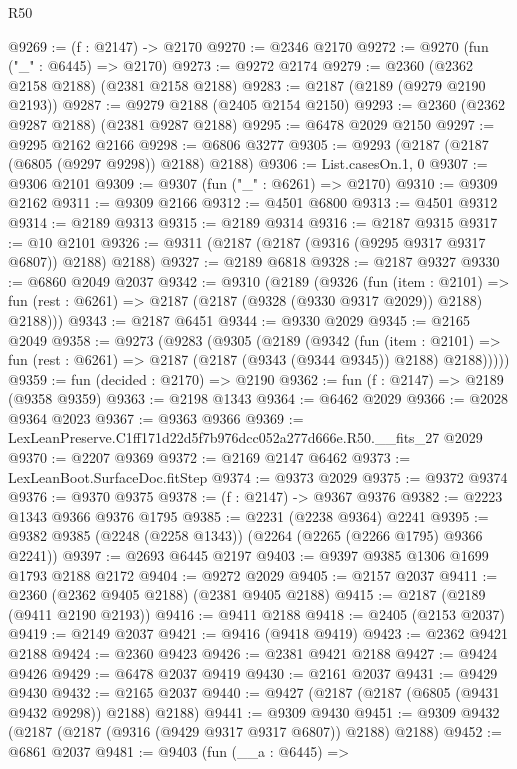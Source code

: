 \begin{lexlean}{R50}
\begin{coremodule}
@9269 := (f : @2147) -> @2170
@9270 := @2346 @2170
@9272 := @9270 (fun ("_" : @6445) => @2170)
@9273 := @9272 @2174
@9279 := @2360 (@2362 @2158 @2188) (@2381 @2158 @2188)
@9283 := @2187 (@2189 (@9279 @2190 @2193))
@9287 := @9279 @2188 (@2405 @2154 @2150)
@9293 := @2360 (@2362 @9287 @2188) (@2381 @9287 @2188)
@9295 := @6478 @2029 @2150
@9297 := @9295 @2162 @2166
@9298 := @6806 @3277
@9305 := @9293 (@2187 (@2187 (@6805 (@9297 @9298)) @2188) @2188)
@9306 := List.casesOn.{1, 0}
@9307 := @9306 @2101
@9309 := @9307 (fun ("_" : @6261) => @2170)
@9310 := @9309 @2162
@9311 := @9309 @2166
@9312 := @4501 @6800
@9313 := @4501 @9312
@9314 := @2189 @9313
@9315 := @2189 @9314
@9316 := @2187 @9315
@9317 := @10 @2101
@9326 := @9311 (@2187 (@2187 (@9316 (@9295 @9317 @9317 @6807)) @2188) @2188)
@9327 := @2189 @6818
@9328 := @2187 @9327
@9330 := @6860 @2049 @2037
@9342 := @9310
    (@2189
      (@9326
        (fun (item : @2101) =>
        fun (rest : @6261) => @2187 (@2187 (@9328 (@9330 @9317 @2029)) @2188) @2188)))
@9343 := @2187 @6451
@9344 := @9330 @2029
@9345 := @2165 @2049
@9358 := @9273
    (@9283
      (@9305
        (@2189
          (@9342
            (fun (item : @2101) =>
            fun (rest : @6261) => @2187 (@2187 (@9343 (@9344 @9345)) @2188) @2188)))))
@9359 := fun (decided : @2170) => @2190
@9362 := fun (f : @2147) => @2189 (@9358 @9359)
@9363 := @2198 @1343
@9364 := @6462 @2029
@9366 := @2028 @9364 @2023
@9367 := @9363 @9366
@9369 := LexLeanPreserve.C1ff171d22d5f7b976dcc052a277d666e.R50.__fits_27 @2029
@9370 := @2207 @9369
@9372 := @2169 @2147 @6462
@9373 := LexLeanBoot.SurfaceDoc.fitStep
@9374 := @9373 @2029
@9375 := @9372 @9374
@9376 := @9370 @9375
@9378 := (f : @2147) -> @9367 @9376
@9382 := @2223 @1343 @9366 @9376 @1795
@9385 := @2231 (@2238 @9364) @2241
@9395 := @9382 @9385 (@2248 (@2258 @1343)) (@2264 (@2265 (@2266 @1795) @9366 @2241))
@9397 := @2693 @6445 @2197
@9403 := @9397 @9385 @1306 @1699 @1793 @2188 @2172
@9404 := @9272 @2029
@9405 := @2157 @2037
@9411 := @2360 (@2362 @9405 @2188) (@2381 @9405 @2188)
@9415 := @2187 (@2189 (@9411 @2190 @2193))
@9416 := @9411 @2188
@9418 := @2405 (@2153 @2037)
@9419 := @2149 @2037
@9421 := @9416 (@9418 @9419)
@9423 := @2362 @9421 @2188
@9424 := @2360 @9423
@9426 := @2381 @9421 @2188
@9427 := @9424 @9426
@9429 := @6478 @2037 @9419
@9430 := @2161 @2037
@9431 := @9429 @9430
@9432 := @2165 @2037
@9440 := @9427 (@2187 (@2187 (@6805 (@9431 @9432 @9298)) @2188) @2188)
@9441 := @9309 @9430
@9451 := @9309 @9432 (@2187 (@2187 (@9316 (@9429 @9317 @9317 @6807)) @2188) @2188)
@9452 := @6861 @2037
@9481 := @9403
    (fun (__a : @6445) =>

\end{coremodule}
\end{lexlean}
